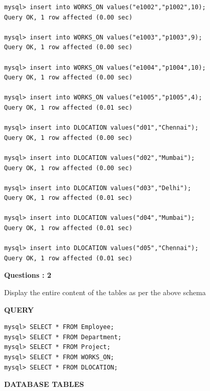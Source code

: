 \documentclass[a4paper,12pt]{report}
\begin{document}
\begin{verbatim}
mysql> insert into WORKS_ON values("e1002","p1002",10);
Query OK, 1 row affected (0.00 sec)

mysql> insert into WORKS_ON values("e1003","p1003",9);
Query OK, 1 row affected (0.00 sec)

mysql> insert into WORKS_ON values("e1004","p1004",10);
Query OK, 1 row affected (0.00 sec)

mysql> insert into WORKS_ON values("e1005","p1005",4);
Query OK, 1 row affected (0.01 sec)

mysql> insert into DLOCATION values("d01","Chennai");
Query OK, 1 row affected (0.00 sec)

mysql> insert into DLOCATION values("d02","Mumbai");
Query OK, 1 row affected (0.00 sec)

mysql> insert into DLOCATION values("d03","Delhi");
Query OK, 1 row affected (0.01 sec)

mysql> insert into DLOCATION values("d04","Mumbai");
Query OK, 1 row affected (0.01 sec)

mysql> insert into DLOCATION values("d05","Chennai");
Query OK, 1 row affected (0.01 sec)
\end{verbatim}

\begin{flushleft}
    \textbf{Questions : 2}
\end{flushleft}
Display the entire content of the tables as per the above schema
\begin{flushleft}
		\textbf{QUERY }
	\end{flushleft}
\begin{verbatim}
mysql> SELECT * FROM Employee;
mysql> SELECT * FROM Department;
mysql> SELECT * FROM Project;
mysql> SELECT * FROM WORKS_ON;
mysql> SELECT * FROM DLOCATION;

\end{verbatim}

\begin{flushleft}
		\textbf{DATABASE TABLES}
\end{flushleft} 
\end{document}
